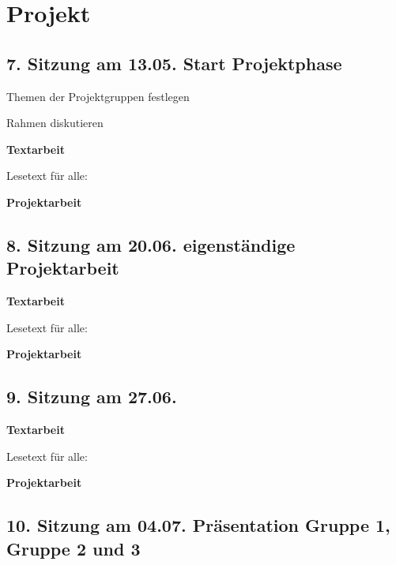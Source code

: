 \documentclass[
  ngerman,
]{article}
\begin{document}
\hypertarget{projekt}{%
\section*{Projekt}\label{projekt}}

\hypertarget{sitzung-am-13.05.-start-projektphase}{%
\subsection*{7. Sitzung am 13.05. \textbar{} Start Projektphase}\label{sitzung-am-13.05.-start-projektphase}}

Themen der Projektgruppen festlegen

Rahmen diskutieren

\textbf{Textarbeit}

Lesetext für alle:

\textbf{Projektarbeit}

\hypertarget{sitzung-am-20.06.-eigenstuxe4ndige-projektarbeit}{%
\subsection*{8. Sitzung am 20.06. \textbar{} eigenständige Projektarbeit}\label{sitzung-am-20.06.-eigenstuxe4ndige-projektarbeit}}

\textbf{Textarbeit}

Lesetext für alle:

\textbf{Projektarbeit}

\hypertarget{sitzung-am-27.06.}{%
\subsection*{9. Sitzung am 27.06. \textbar{}}\label{sitzung-am-27.06.}}

\textbf{Textarbeit}

Lesetext für alle:

\textbf{Projektarbeit}

\hypertarget{sitzung-am-04.07.-pruxe4sentation-gruppe-1-gruppe-2-und-3}{%
\subsection*{10. Sitzung am 04.07. \textbar{} Präsentation Gruppe 1, Gruppe 2 und 3}\label{sitzung-am-04.07.-pruxe4sentation-gruppe-1-gruppe-2-und-3}}
\end{document}
